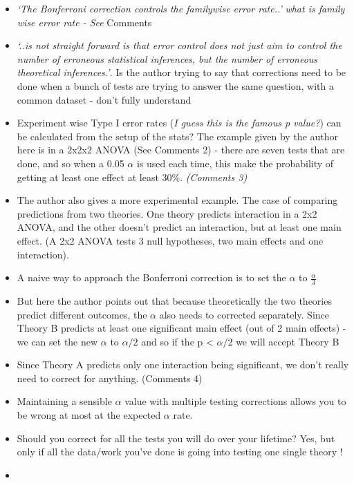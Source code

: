 \documentclass[
]{book}
\begin{document}
\begin{itemize}
\item
  \emph{`The Bonferroni correction controls the familywise error rate..'} \protect\hypertarget{lakens_com}{}{\emph{what is family wise error rate - See} Comments}
\item
  \emph{`..is not straight forward is that error control does not just aim to control the number of erroneous statistical inferences, but the number of erroneous theoretical inferences.'}. Is the author trying to say that corrections need to be done when a bunch of tests are trying to answer the same question, with a common dataset - don't fully understand
\item
  Experiment wise Type I error rates (\emph{I guess this is the famous p value?}) can be calculated from the setup of the stats? The example given by the author here is in a 2x2x2 ANOVA (See \protect\hypertarget{lakens_com}{}{Comments 2}) - there are seven tests that are done, and so when a 0.05 \(\alpha\) is used each time, this make the probability of getting at least one effect at least 30\%. \emph{(\protect\hypertarget{lakens_com}{}{Comments 3})}
\item
  The author also gives a more experimental example. The case of comparing predictions from two theories. One theory predicts interaction in a 2x2 ANOVA, and the other doesn't predict an interaction, but at least one main effect. (A 2x2 ANOVA tests 3 null hypotheses, two main effects and one interaction).\\
\item
  A naive way to approach the Bonferroni correction is to set the \(\alpha\) to \(\frac{\alpha}{3}\)
\item
  But here the author points out that because theoretically the two theories predict different outcomes, the \(\alpha\) also needs to corrected separately. Since Theory B predicts at least one significant main effect (out of 2 main effects) - we can set the new \(\alpha\) to \(\alpha /2\) and so if the p \textless{} \(\alpha/2\) we will accept Theory B
\item
  Since Theory A predicts only one interaction being significant, we don't really need to correct for anything. (\protect\hypertarget{lakens_com}{}{Comments 4})
\item
  Maintaining a sensible \(\alpha\) value with multiple testing corrections allows you to be wrong at most at the expected \(\alpha\) rate.
\item
  Should you correct for all the tests you will do over your lifetime? Yes, but only if all the data/work you've done is going into testing one single theory !
\item
\end{itemize}
\end{document}

